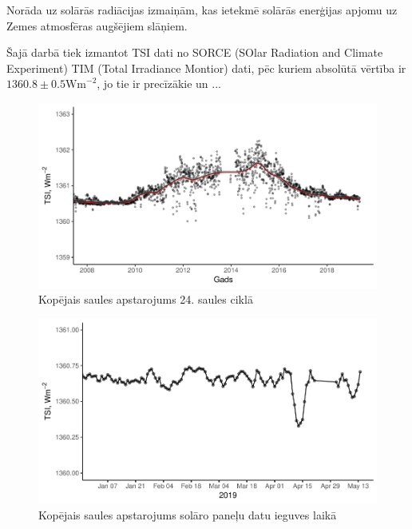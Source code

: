 Norāda uz solārās radiācijas izmaiņām, kas ietekmē solārās enerģijas apjomu uz Zemes atmosfēras augšējiem slāņiem.


Šajā darbā tiek izmantot TSI dati no SORCE (SOlar Radiation and Climate Experiment) TIM (Total Irradiance Montior) dati, pēc kuriem absolūtā vērtība ir $1360.8 \pm 0.5 \textrm{Wm}^{-2}$, jo tie ir precīzākie un ...\cite{Frohlich2012}

\begin{figure}[h]
    \centering
    \includegraphics[width=\linewidth]{figures/misc/TSI_8-19.pdf}
    \caption{Kopējais saules apstarojums 24. saules ciklā}
    \label{fig:TSI1}
\end{figure}

\begin{figure}[h]
    \centering
    \includegraphics[width=\linewidth]{figures/misc/TSI.pdf}
    \caption{Kopējais saules apstarojums solāro paneļu datu ieguves laikā}
    \label{fig:TSI2}
\end{figure}